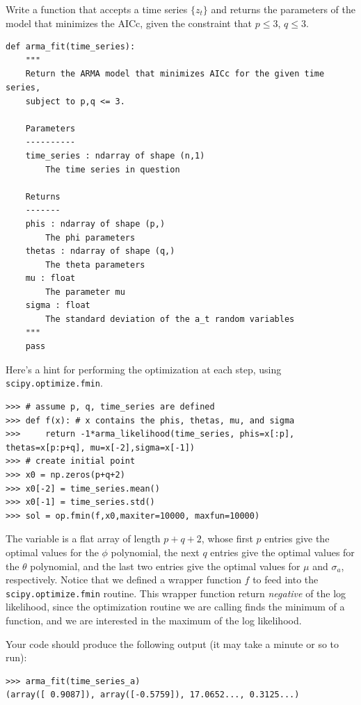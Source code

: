 \begin{problem}
\label{prob:arma:mle}
Write a function that accepts a time series $\{z_t\}$ and returns the
parameters of the model that minimizes the AICc, given the constraint that $p
\leq 3$, $q \leq 3$.

\begin{lstlisting}
def arma_fit(time_series):
    """
    Return the ARMA model that minimizes AICc for the given time series,
    subject to p,q <= 3.

    Parameters
    ----------
    time_series : ndarray of shape (n,1)
        The time series in question

    Returns
    -------
    phis : ndarray of shape (p,)
        The phi parameters
    thetas : ndarray of shape (q,)
        The theta parameters
    mu : float
        The parameter mu
    sigma : float
        The standard deviation of the a_t random variables
    """
    pass
\end{lstlisting}
\vspace{3mm} \noindent
Here's a hint for performing the optimization at each step, using {\tt scipy.optimize.fmin}.
\begin{lstlisting}
>>> # assume p, q, time_series are defined
>>> def f(x): # x contains the phis, thetas, mu, and sigma
>>>     return -1*arma_likelihood(time_series, phis=x[:p], thetas=x[p:p+q], mu=x[-2],sigma=x[-1])
>>> # create initial point
>>> x0 = np.zeros(p+q+2)
>>> x0[-2] = time_series.mean()
>>> x0[-1] = time_series.std()
>>> sol = op.fmin(f,x0,maxiter=10000, maxfun=10000)
\end{lstlisting}
\vspace{3mm} \noindent
The variable  is a flat array of length $p+q+2$, whose first $p$ entries give the optimal values
for the $\phi$ polynomial, the next $q$ entries give the optimal values for the $\theta$ polynomial,
and the last two entries give the optimal values for $\mu$ and $\sigma_a$, respectively.
Notice that we defined a wrapper function $f$ to feed into the {\tt scipy.optimize.fmin} routine.
This wrapper function return \emph{negative} of the log likelihood, since the optimization routine we are
calling finds the minimum of a function, and we are interested in the maximum of the log likelihood.

Your code should produce the following output (it may take a minute or so to run):
\begin{lstlisting}
>>> arma_fit(time_series_a)
(array([ 0.9087]), array([-0.5759]), 17.0652..., 0.3125...)
\end{lstlisting}
\end{problem}

